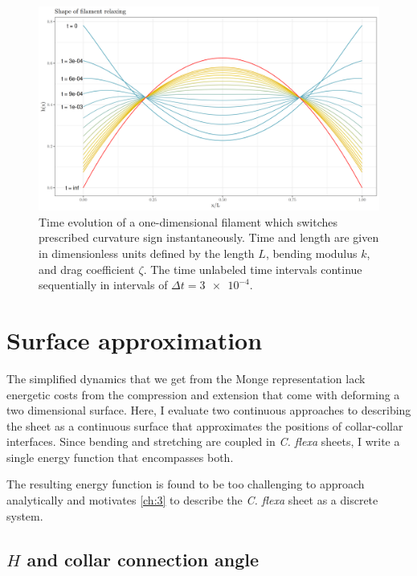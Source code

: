 \begin{figure}[bthp]
    \centering
    \includegraphics[width=\textwidth]{shapes.png}
    \caption[Dynamics of a one-dimensional filament model]{Time evolution of a one-dimensional filament which switches prescribed curvature sign instantaneously. Time and length are given in dimensionless units defined by the length $L$, bending modulus $k$, and drag coefficient $\zeta$. The time unlabeled time intervals continue sequentially in intervals of $\Delta t = \num{3e-4}$.}
    \label{fig:shapes}
\end{figure}

\section{Surface approximation}

The simplified dynamics that we get from the Monge representation lack energetic costs from the compression and extension that come with deforming a two dimensional surface. 
Here, I evaluate two continuous approaches to describing the sheet as a continuous surface that approximates the positions of collar-collar interfaces.
Since bending and stretching are coupled in \textit{C. flexa} sheets, I write a single energy function that encompasses both.

The resulting energy function is found to be too challenging to approach analytically and motivates \cref{ch:3} to describe the \textit{C. flexa} sheet as a discrete system.

\subsection{$H$ and collar connection angle} \label{subsec:h_phi}

